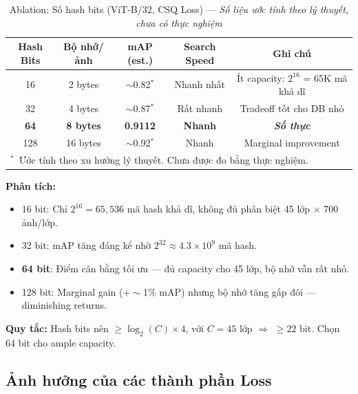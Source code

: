 \documentclass[13pt,a4paper]{article}
\begin{document}
\begin{table}[H]
\centering
\caption{Ablation: Số hash bits (ViT-B/32, CSQ Loss) --- \textit{Số liệu ước tính theo lý thuyết, chưa có thực nghiệm}}
\label{tab:ablation_bits}
\begin{tabular}{ccccc}
\toprule
\textbf{Hash Bits} & \textbf{Bộ nhớ/ảnh} & \textbf{mAP (est.)} & \textbf{Search Speed} & \textbf{Ghi chú} \\
\midrule
16  & 2 bytes   & $\sim$0.82$^*$  & Nhanh nhất  & Ít capacity: $2^{16}$ = 65K mã khả dĩ \\
32  & 4 bytes   & $\sim$0.87$^*$  & Rất nhanh   & Tradeoff tốt cho DB nhỏ \\
\textbf{64}  & \textbf{8 bytes}   & \textbf{0.9112} & \textbf{Nhanh} & \textbf{\textit{Số thực}} \\
128 & 16 bytes  & $\sim$0.92$^*$  & Nhanh       & Marginal improvement \\
\bottomrule
\multicolumn{5}{l}{\small $^*$~Ước tính theo xu hướng lý thuyết. Chưa được đo bằng thực nghiệm.}
\end{tabular}
\end{table}

\textbf{Phân tích:}
\begin{itemize}
    \item 16 bit: Chỉ $2^{16} = 65{,}536$ mã hash khả dĩ, không đủ phân biệt 45 lớp $\times$ 700 ảnh/lớp.
    \item 32 bit: mAP tăng đáng kể nhờ $2^{32} \approx 4.3 \times 10^9$ mã hash.
    \item \textbf{64 bit}: Điểm cân bằng tối ưu --- đủ capacity cho 45 lớp, bộ nhớ vẫn rất nhỏ.
    \item 128 bit: Marginal gain ($+\sim$1\% mAP) nhưng bộ nhớ tăng gấp đôi --- diminishing returns.
\end{itemize}

\textbf{Quy tắc:} Hash bits nên $\geq \log_2(C) \times 4$, với $C = 45$ lớp $\Rightarrow$ $\geq 22$ bit. Chọn 64 bit cho ample capacity.


\subsection{Ảnh hưởng của các thành phần Loss}
\end{document}

